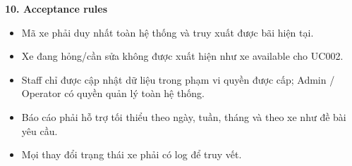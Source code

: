 \textbf{10. Acceptance rules}
\begin{itemize}
  \item Mã xe phải duy nhất toàn hệ thống và truy xuất được bãi hiện tại.
  \item Xe đang hỏng/cần sửa không được xuất hiện như xe available cho UC002.
  \item Staff chỉ được cập nhật dữ liệu trong phạm vi quyền được cấp; Admin / Operator có quyền quản lý toàn hệ thống.
  \item Báo cáo phải hỗ trợ tối thiểu theo ngày, tuần, tháng và theo xe như đề bài yêu cầu.
  \item Mọi thay đổi trạng thái xe phải có log để truy vết.
\end{itemize}
